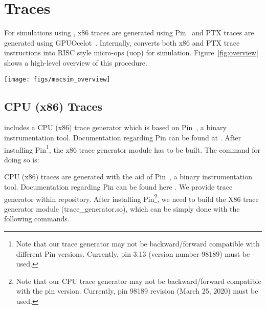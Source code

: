 \chapter{Traces}
\label{ch:trace}

For simulations using \SIM, x86 traces are generated using Pin~\cite{pin} and
PTX traces are generated using GPUOcelot~\cite{ocelot}. Internally, \SIM
converts both x86 and PTX trace instructions into RISC style micro-ops (uop)
for simulation. Figure~\ref{fig:overview} shows a high-level overview of
this procedure. 

\begin{figure*}[htb]
\centering \texttt{[image: figs/macsim\_overview]}
\caption{The overview of MacSim Traces Generation}
\label{fig:overview}
\end{figure*}





\section{CPU (x86) Traces}

\SIM includes a CPU (x86) trace generator which is based on Pin~\cite{pin}, a
binary instrumentation tool. Documentation regarding Pin can be found at
. 
After installing Pin\footnote{Note that our
trace generator may not be backward/forward compatible with different Pin
versions. Currently, pin 3.13 (version number 98189)  must be used.}, the x86
trace generator module has to be built. The command for doing so is:


\ignore
		{
		CPU (x86) traces are generated with the aid of Pin~\cite{pin}, a
		binary instrumentation tool.  Documentation regarding Pin can be found 
		here . 
		We provide \cpu trace generator within \SIM repository. After installing
		Pin\footnote{Note that our CPU trace generator may not be
		  backward/forward compatible with the pin version. Currently, pin
		  98189 revision (March 25, 2020) must be used.}, we need to build the
		X86 trace generator module (trace\_generator.so), which can be simply
		done with the following commands.
		}



